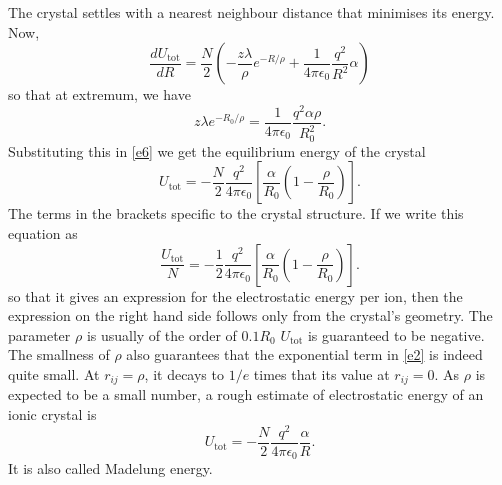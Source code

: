 \documentclass{article}
\begin{document}
The crystal settles with a nearest neighbour distance that minimises its energy.
Now,
\[
\frac{dU_\text{tot}}{dR} = \frac{N}{2}\left(-\frac{z\lambda}{\rho}e^{-R/\rho} + 
\frac{1}{4\pi\epsilon_0} \frac{q^2}{R^2}\alpha\right)
\]
so that at extremum, we have
\begin{equation}\label{e7}
z\lambda  e^{-R_0/\rho} = \frac{1}{4\pi\epsilon_0} \frac{q^2\alpha\rho}{R_0^2}.
\end{equation}
Substituting this in \eqref{e6} we get the equilibrium energy of the crystal
\begin{equation}\label{e8}
U_\text{tot} = -\frac{N}{2}\frac{q^2}{4\pi\epsilon_0}\left[\frac{\alpha}{R_0}
\left(1 - \frac{\rho}{R_0}\right)\right].
\end{equation}
The terms in the brackets specific to the crystal structure. If we write this
equation as 
\begin{equation}\label{e9}
\frac{U_\text{tot}}{N} = -\frac{1}{2}\frac{q^2}{4\pi\epsilon_0}
\left[\frac{\alpha}{R_0} \left(1 - \frac{\rho}{R_0}\right)\right].
\end{equation}
so that it gives an expression for the electrostatic energy per ion, then the
expression on the right hand side follows only from the crystal's geometry.
The parameter $\rho$ is usually of the order of $0.1 R_0$ $U_\text{tot}$ is
guaranteed to be negative. The smallness of $\rho$ also guarantees that the 
exponential term in \eqref{e2} is indeed quite small. At $r_{ij} = \rho$, it
decays to $1/e$ times that its value at $r_{ij} = 0$. As $\rho$ is expected to
be a small number, a rough estimate of electrostatic energy of an ionic crystal
is
\begin{equation}\label{e10}
U_\text{tot} = -\frac{N}{2}\frac{q^2}{4\pi\epsilon_0}\frac{\alpha}{R}.
\end{equation}
It is also called Madelung energy.
\end{document}
